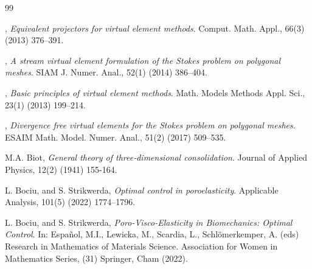 \documentclass[smallextended]{svjour3}
\numberwithin{equation}{section}
\numberwithin{figure}{section}
\numberwithin{table}{section}
\begin{document}
			\begin{thebibliography}{99}
				
				\small
				
				
		, {\it Equivalent projectors for virtual element methods}. Comput. Math. Appl., 66(3) (2013) 376--391.
				
		, {\it A stream virtual element formulation of the {S}tokes problem	on polygonal meshes}. SIAM J. Numer. Anal., 52(1) (2014) 386--404.
				
		, {\it Basic principles of virtual element methods}. Math. Models Methods Appl. Sci., 23(1) (2013) 199--214.
				
		, {\it Divergence free virtual elements for the Stokes problem on polygonal meshes}. ESAIM Math. Model. Numer. Anal., 51(2) (2017) 509--535.

         {\sc M.A. Biot}, {\it General theory of three‐dimensional consolidation}. Journal of Applied Physics, 12(2) (1941) 155-164.
				
	     {\sc L. Bociu, and S. Strikwerda}, {\it Optimal control in poroelasticity}. Applicable Analysis, 101(5) (2022) 1774--1796.

         {\sc L. Bociu, and S. Strikwerda}, {\it  Poro-Visco-Elasticity in Biomechanics: Optimal Control}. In: Español, M.I., Lewicka, M., Scardia, L., Schlömerkemper, A. (eds) Research in Mathematics of Materials Science. Association for Women in Mathematics Series, (31) Springer, Cham (2022). 
				

\end{thebibliography}
\end{document}
